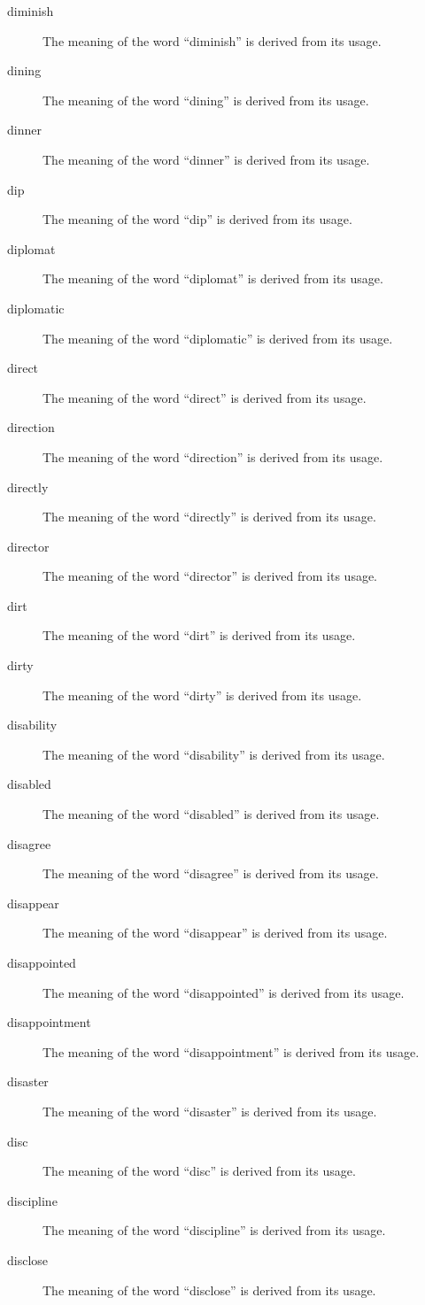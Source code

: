 \documentclass[12pt, letterpaper]{memoir}
\begin{document}
\begin{description}
\item[diminish] The meaning of the word ``diminish'' is derived from its usage.
\item[dining] The meaning of the word ``dining'' is derived from its usage.
\item[dinner] The meaning of the word ``dinner'' is derived from its usage.
\item[dip] The meaning of the word ``dip'' is derived from its usage.
\item[diplomat] The meaning of the word ``diplomat'' is derived from its usage.
\item[diplomatic] The meaning of the word ``diplomatic'' is derived from its usage.
\item[direct] The meaning of the word ``direct'' is derived from its usage.
\item[direction] The meaning of the word ``direction'' is derived from its usage.
\item[directly] The meaning of the word ``directly'' is derived from its usage.
\item[director] The meaning of the word ``director'' is derived from its usage.
\item[dirt] The meaning of the word ``dirt'' is derived from its usage.
\item[dirty] The meaning of the word ``dirty'' is derived from its usage.
\item[disability] The meaning of the word ``disability'' is derived from its usage.
\item[disabled] The meaning of the word ``disabled'' is derived from its usage.
\item[disagree] The meaning of the word ``disagree'' is derived from its usage.
\item[disappear] The meaning of the word ``disappear'' is derived from its usage.
\item[disappointed] The meaning of the word ``disappointed'' is derived from its usage.
\item[disappointment] The meaning of the word ``disappointment'' is derived from its usage.
\item[disaster] The meaning of the word ``disaster'' is derived from its usage.
\item[disc] The meaning of the word ``disc'' is derived from its usage.
\item[discipline] The meaning of the word ``discipline'' is derived from its usage.
\item[disclose] The meaning of the word ``disclose'' is derived from its usage.

\end{description}
\end{document}
